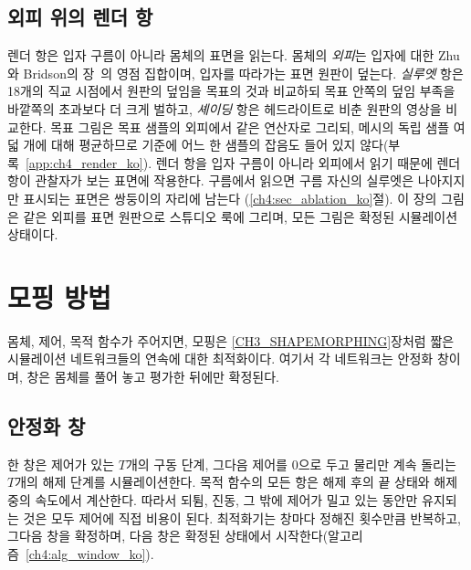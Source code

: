 \subsection{외피 위의 렌더 항}
\label{ch4:sec_exterior_ko}
렌더 항은 입자 구름이 아니라 몸체의 표면을 읽는다. 몸체의 \emph{외피}는 입자에 대한 Zhu와 Bridson의 장~\citep{zhu2005sand}의
영점 집합이며, 입자를 따라가는 표면 원판이 덮는다. \emph{실루엣} 항은 18개의 직교 시점에서 원판의 덮임을 목표의 것과
비교하되 목표 안쪽의 덮임 부족을 바깥쪽의 초과보다 더 크게 벌하고, \emph{셰이딩} 항은 헤드라이트로 비춘 원판의 영상을
비교한다. 목표 그림은 목표 샘플의 외피에서 같은 연산자로 그리되, 메시의 독립 샘플 여덟 개에 대해 평균하므로 기준에 어느 한
샘플의 잡음도 들어 있지 않다(부록~\ref{app:ch4_render_ko}). 렌더 항을 입자 구름이 아니라 외피에서 읽기 때문에 렌더 항이
관찰자가 보는 표면에 작용한다. 구름에서 읽으면 구름 자신의 실루엣은 나아지지만 표시되는 표면은 쌍둥이의 자리에 남는다
(\ref{ch4:sec_ablation_ko}절). 이 장의 그림은 같은 외피를 표면 원판으로 스튜디오 룩에 그리며, 모든 그림은 확정된 시뮬레이션
상태이다.

\section{모핑 방법}
\label{ch4:sec_method_ko}

몸체, 제어, 목적 함수가 주어지면, 모핑은 \ref{CH3_SHAPEMORPHING}장처럼 짧은 시뮬레이션 네트워크들의 연속에 대한
최적화이다. 여기서 각 네트워크는 안정화 창이며, 창은 몸체를 풀어 놓고 평가한 뒤에만 확정된다.

\subsection{안정화 창}
한 창은 제어가 있는 $T$개의 구동 단계, 그다음 제어를 0으로 두고 물리만 계속 돌리는 $T$개의 해제 단계를 시뮬레이션한다.
목적 함수의 모든 항은 해제 후의 끝 상태와 해제 중의 속도에서 계산한다. 따라서 되튐, 진동, 그 밖에 제어가 밀고 있는 동안만
유지되는 것은 모두 제어에 직접 비용이 된다. 최적화기는 창마다 정해진 횟수만큼 반복하고, 그다음 창을 확정하며, 다음 창은
확정된 상태에서 시작한다(알고리즘~\ref{ch4:alg_window_ko}).

